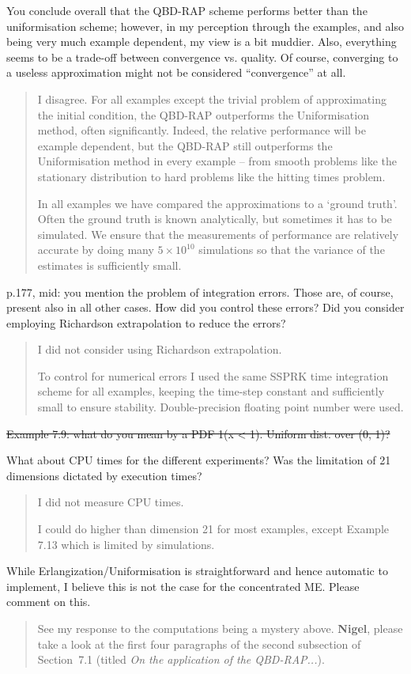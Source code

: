 \documentclass[a4paper]{article}
\begin{document}
You conclude overall that the QBD-RAP scheme performs better than the uniformisation scheme; however, in my perception through the examples, and also being very much example dependent, my view is a bit muddier. Also, everything seems to be a trade-off between convergence vs. quality. Of course, converging to a useless approximation might not be considered “convergence” at all.
\begin{quote}
    I disagree. For all examples except the trivial problem of approximating the initial condition, the QBD-RAP outperforms the Uniformisation method, often significantly. Indeed, the relative performance will be example dependent, but the QBD-RAP still outperforms the Uniformisation method in every example -- from smooth problems like the stationary distribution to hard problems like the hitting times problem.
    
    In all examples we have compared the approximations to a `ground truth'. Often the ground truth is known analytically, but sometimes it has to be simulated. We ensure that the measurements of performance are relatively accurate by doing many \(5\times 10^10\) simulations so that the variance of the estimates is sufficiently small. 
\end{quote}

p.177, mid: you mention the problem of integration errors. Those are, of course, present also in all other cases. How did you control these errors? Did you consider employing Richardson extrapolation to reduce the errors?
\begin{quote}
    I did not consider using Richardson extrapolation. 

    To control for numerical errors I used the same SSPRK time integration scheme for all examples, keeping the time-step constant and sufficiently small to ensure stability. Double-precision floating point number were used. 
\end{quote}

\st{Example 7.9: what do you mean by a PDF 1(x < 1). Uniform dist. over (0, 1)?}

What about CPU times for the different experiments? Was the limitation of 21 dimensions dictated by execution times?
\begin{quote}
    I did not measure CPU times. 

    I could do higher than dimension 21 for most examples, except Example 7.13 which is limited by simulations.
\end{quote}

While Erlangization/Uniformisation is straightforward and hence automatic to implement, I believe this is not the case for the concentrated ME. Please comment on this.
\begin{quote}
    See my response to the computations being a mystery above. \textbf{Nigel}, please take a look at the first four paragraphs of the second subsection of Section~7.1 (titled \emph{On the application of the QBD-RAP...}). 
\end{quote}
\end{document}
